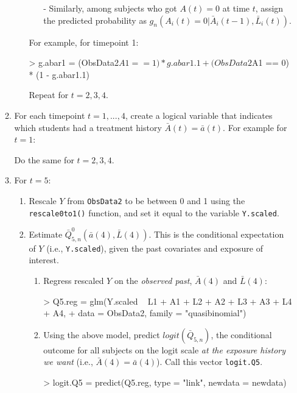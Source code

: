 \documentclass[answers]{exam}
\begin{document}
\begin{enumerate}
\begin{enumerate}
\begin{enumerate}
\begin{itemize}
\item[-] Similarly, among subjects who got $A(t) = 0$ at time $t$, assign the predicted probability as $g_n(A_i(t) = 0| \bar{A}_i(t-1), \bar{L}_i(t))$.
\end{itemize}
For example, for timepoint 1:
\begin{Schunk}
\begin{Sinput}
> g.abar1 = (ObsData2$A1 == 1) * g.abar1.1 + (ObsData2$A1 == 0) * (1 - g.abar1.1)
\end{Sinput}
\end{Schunk}
Repeat for $t = 2, 3, 4$.
\end{enumerate}
\item For each timepoint $t = 1,...,4$, create a logical variable that indicates which students had a treatment history $\bar{A}(t) = \bar{a}(t)$. For example for $t = 1$:
\begin{Schunk}
\end{Schunk}
Do the same for $t = 2, 3, 4$.
\item For $t = 5$:
\begin{enumerate}
\item Rescale $Y$ from \texttt{ObsData2} to be between 0 and 1 using the \texttt{rescale0to1()} function, and set it equal to the variable \texttt{Y.scaled}.
\item Estimate $\bar{Q}^0_{5,n}(\bar{a}(4), \bar{L}(4))$. This is the conditional expectation of $Y$ (i.e., \texttt{Y.scaled}), given the past covariates and exposure of interest.
\begin{enumerate}
\item Regress rescaled $Y$ on the \textit{observed past}, $\bar{A}(4)$ and $\bar{L}(4)$:
\begin{Schunk}
\begin{Sinput}
> Q5.reg = glm(Y.scaled ~ L1 + A1 + L2 + A2 + L3 + A3 + L4 + A4, 
+              data = ObsData2, family = "quasibinomial")
\end{Sinput}
\end{Schunk}
\item Using the above model, predict $logit(\bar{Q}_{5,n})$, the conditional outcome for all subjects on the logit scale \textit{at the exposure history we want} (i.e., $\bar{A}(4) = \bar{a}(4)$). Call this vector \texttt{logit.Q5}.
\begin{Schunk}
\begin{Sinput}
> logit.Q5 = predict(Q5.reg, type = "link", newdata = newdata)

\end{Sinput}
\end{Schunk}
\end{enumerate}
\end{enumerate}
\end{enumerate}
\end{enumerate}
\end{document}
